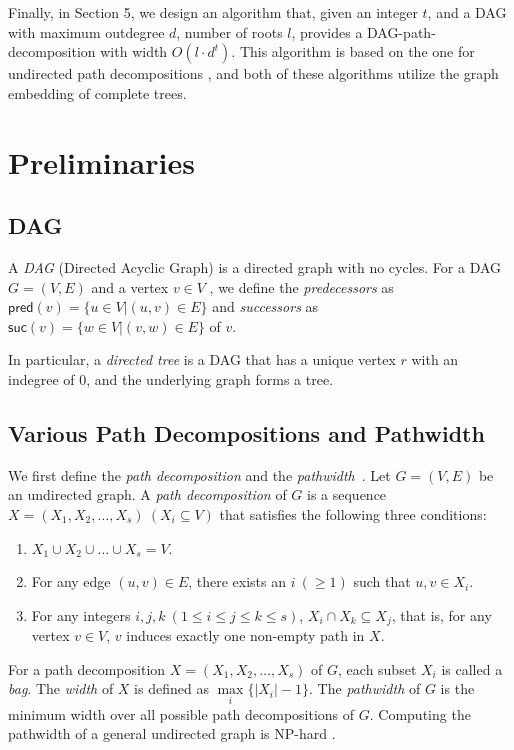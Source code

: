\documentclass[runningheads]{llncs}
\theoremstyle{plain}
\theoremstyle{definition}
\begin{document}
Finally, in Section 5, we design an algorithm that, given an integer $t$, and a DAG with maximum outdegree $d$, number of roots $l$, provides a DAG-path-decomposition with width $O(l \cdot d^t)$. This algorithm is based on the one for undirected path decompositions \cite{art8}, and both of these algorithms utilize the graph embedding of complete trees.






\section{Preliminaries}

\subsection{DAG}
A \emph{DAG} (Directed Acyclic Graph) is a directed graph with no cycles. For a DAG $G = (V, E)$ and a vertex $v \in V$ , we define the \emph{predecessors} as $\mathsf{pred}(v) = \{ u \in V | (u, v) \in E\}$ and \emph{successors} as $\mathsf{suc}(v) = \{ w \in V | (v, w) \in E\}$ of $v$.

In particular, a \emph{directed tree} is a DAG that has a unique vertex $r$ with an indegree of 0, and the underlying graph forms a tree.
   

\subsection{Various Path Decompositions and Pathwidth}
We first define the \emph{path decomposition} and the \emph{pathwidth}~\cite{art1}. Let $G = (V, E)$ be an undirected graph. A \emph{path decomposition} of $G$ is a sequence $X = (X_1, X_2, \dots, X_s) ~(X_i \subseteq V)$ that satisfies the following three conditions:
\begin{enumerate}
    \item $X_1 \cup X_2 \cup \dots \cup X_s = V$.
    \item For any edge $(u, v) \in E$, there exists an $i \ (\geq 1)$ such that $u, v \in X_i$.
    \item For any integers $i, j, k\ (1 \leq i \leq j \leq k \leq s)$, $X_i \cap X_k \subseteq X_j$, that is, for any vertex $v \in V$, $v$ induces exactly one non-empty path in $X$.
\end{enumerate}

For a path decomposition $X = (X_1, X_2, \dots, X_s)$ of $G$, each subset $X_i$ is called a \emph{bag}. The \emph{width} of $X$ is defined as $\underset{i}{\max} \{ |X_i| - 1 \}$. The \emph{pathwidth} of $G$ is the minimum width over all possible path decompositions of $G$. Computing the pathwidth of a general undirected graph is NP-hard \cite{art3}.
\end{document}
